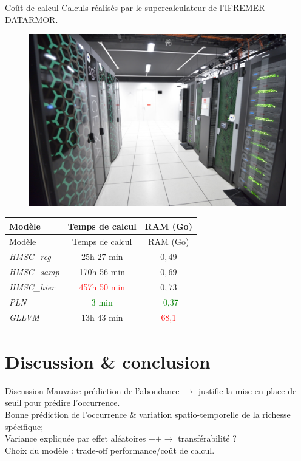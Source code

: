 \documentclass[%
]{beamer}
\begin{document}
	\begin{frame}{Coût de calcul}
	Calculs réalisés par le supercalculateur de l'IFREMER DATARMOR.\vfill
		\begin{figure}[t]
		\begin{center}
			\includegraphics[scale=0.7]{figs/DATARMOR.jpg}
		\end{center}
	\end{figure}
		\begin{longtable}[]{lcc}
			\toprule
			Modèle & Temps de calcul & RAM (Go)\tabularnewline
			\midrule
			\endfirsthead
			\toprule
			Modèle & Temps de calcul & RAM (Go)\tabularnewline
			\midrule
			\endhead
			\emph{HMSC\_reg} & 25h 27 min & \(0,49\)\tabularnewline
			\emph{HMSC\_samp} &170h 56 min & \(0,69\)\tabularnewline
			\emph{HMSC\_hier} & \textcolor{red}{457h 50 min} & \(0,73\)\tabularnewline
			\emph{PLN} & \textcolor{green}{3 min} & ~\textcolor{green}{0,37}\tabularnewline
			\emph{GLLVM} & 13h 43 min & \textcolor{red}{68,1}\tabularnewline
			\bottomrule
		\end{longtable}
	
	\end{frame}
	
	\section{Discussion \& conclusion}
	\begin{frame}{Discussion}
		Mauvaise prédiction de l'abondance $\rightarrow$ justifie la mise en place de seuil pour prédire l'occurrence.\pause\vspace{\baselineskip}\\
		Bonne prédiction de l'occurrence \& variation spatio-temporelle de la richesse spécifique;\pause\vspace{\baselineskip}\\
		Variance expliquée par effet aléatoires $++ \rightarrow$ transférabilité ?\pause\vspace{\baselineskip}\\
		Choix du modèle : trade-off performance/coût de calcul.
	\end{frame}
	
\end{document}
